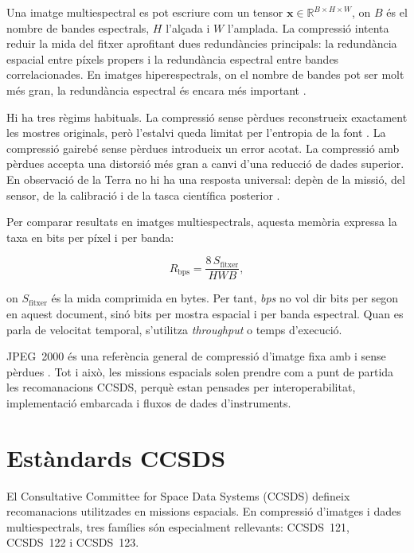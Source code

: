 Una imatge multiespectral es pot escriure com un tensor
$\mathbf{x}\in\mathbb{R}^{B\times H\times W}$, on $B$ és el nombre de bandes
espectrals, $H$ l'alçada i $W$ l'amplada. La compressió intenta reduir la mida
del fitxer aprofitant dues redundàncies principals: la redundància espacial
entre píxels propers i la redundància espectral entre bandes correlacionades.
En imatges hiperespectrals, on el nombre de bandes pot ser molt més gran, la
redundància espectral és encara més important \cite{bioucas2013hyperspectral,
guanter2015enmap}.

Hi ha tres règims habituals. La compressió sense pèrdues reconstrueix
exactament les mostres originals, però l'estalvi queda limitat per l'entropia
de la font \cite{cover2006information,sayood2017compression}. La compressió
gairebé sense pèrdues introdueix un error acotat. La compressió amb pèrdues
accepta una distorsió més gran a canvi d'una reducció de dades superior. En
observació de la Terra no hi ha una resposta universal: depèn de la missió, del
sensor, de la calibració i de la tasca científica posterior
\cite{blanes2014tutorial,gonzalez2025robustness}.

Per comparar resultats en imatges multiespectrals, aquesta memòria expressa la
taxa en bits per píxel i per banda:

\begin{equation}
R_{\mathrm{bps}} =
\frac{8\,S_{\mathrm{fitxer}}}{HWB},
\label{eq:bps_intro}
\end{equation}

on $S_{\mathrm{fitxer}}$ és la mida comprimida en bytes. Per tant, \emph{bps}
no vol dir bits per segon en aquest document, sinó bits per mostra espacial i
per banda espectral. Quan es parla de velocitat temporal, s'utilitza
\emph{throughput} o temps d'execució.

JPEG~2000 és una referència general de compressió d'imatge fixa amb i sense
pèrdues \cite{iso15444}. Tot i això, les missions espacials solen prendre com
a punt de partida les recomanacions CCSDS, perquè estan pensades per
interoperabilitat, implementació embarcada i fluxos de dades d'instruments.

\section{Estàndards CCSDS}\label{sec:ccsds}

El Consultative Committee for Space Data Systems (CCSDS) defineix
recomanacions utilitzades en missions espacials. En compressió d'imatges i
dades multiespectrals, tres famílies són especialment rellevants: CCSDS~121,
CCSDS~122 i CCSDS~123.

